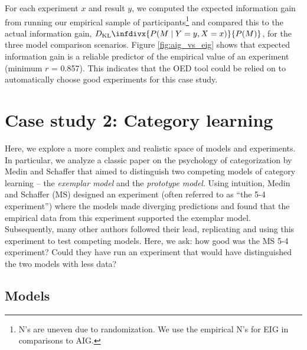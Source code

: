 \documentclass{article}
\newcommand{\dkl}{D_\mathrm{KL}\infdivx}
\begin{document}
For each experiment $x$ and result $y$, we computed the expected information gain from running our empirical sample of participants\footnote{N's are uneven due to randomization. We use the empirical N's for EIG in comparisons to AIG.} and compared this to the actual information gain, $\dkl{P(M \mid Y = y, X = x)}{P(M)}$, for the three model comparison scenarios.
Figure \ref{fig:aig_vs_eig} shows that expected information gain is a reliable predictor of the empirical value of an experiment (minimum $r$ = 0.857). This indicates that the OED tool could be relied on to automatically choose good experiments for this case study.


\section{Case study 2: Category learning}

Here, we explore a more complex and realistic space of models and experiments.
In particular, we analyze a classic paper on the psychology of categorization by Medin and Schaffer \cite{medin78:pr} that aimed to distinguish two competing models of category learning -- the \emph{exemplar model} and the \emph{prototype model}.
Using intuition, Medin and Schaffer (MS) designed an experiment (often referred to as ``the 5-4 experiment'') where the models made diverging predictions and found that the empirical data from this experiment supported the exemplar model.
Subsequently, many other authors followed their lead, replicating and using this experiment to test competing models.
Here, we ask: how good was the MS 5-4 experiment?
Could they have run an experiment that would have distinguished the two models with less data?




\subsection{Models}
\end{document}

